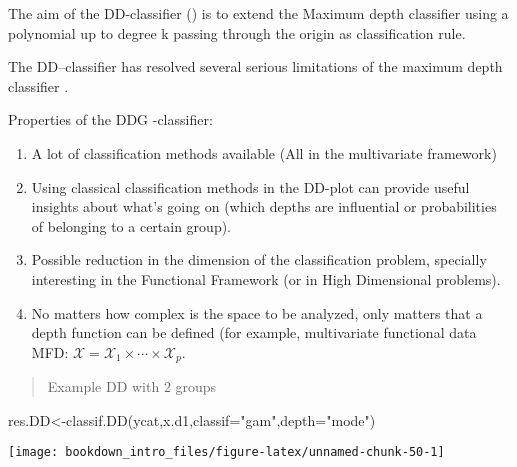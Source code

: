 \documentclass[
]{book}
\newenvironment{Shaded}{\begin{snugshade}}{\end{snugshade}}
\newcommand{\AttributeTok}[1]{\textcolor[rgb]{0.77,0.63,0.00}{#1}}
\newcommand{\FunctionTok}[1]{\textcolor[rgb]{0.00,0.00,0.00}{#1}}
\newcommand{\NormalTok}[1]{#1}
\newcommand{\OtherTok}[1]{\textcolor[rgb]{0.56,0.35,0.01}{#1}}
\newcommand{\SpecialCharTok}[1]{\textcolor[rgb]{0.00,0.00,0.00}{#1}}
\newcommand{\StringTok}[1]{\textcolor[rgb]{0.31,0.60,0.02}{#1}}
\begin{document}
The aim of the DD-classifier (\citep{Li2012}) is to extend the Maximum depth classifier using a polynomial up to degree k passing through the origin as classification rule.

The DD--classifier has resolved several serious limitations of the maximum depth classifier .

Properties of the DDG -classifier:

\begin{enumerate}
\def\labelenumi{\arabic{enumi}.}
\item
  A lot of classification methods available (All in the multivariate framework)
\item
  Using classical classification methods in the DD-plot can provide useful insights about what's going on (which depths are influential or probabilities of belonging to a certain group).
\item
  Possible reduction in the dimension of the classification problem, specially interesting in the Functional Framework (or in High Dimensional problems).
\item
  No matters how complex is the space to be analyzed, only matters that a depth function can be defined (for example, multivariate functional data MFD: \(\mathcal{X}=\mathcal{X}_1\times\cdots\times\mathcal{X}_p\).
\end{enumerate}

\begin{quote}
Example DD with 2 groups
\end{quote}

\begin{Shaded}
\begin{Highlighting}[]
\NormalTok{res.DD}\OtherTok{\textless{}{-}}\FunctionTok{classif.DD}\NormalTok{(ycat,x.d1,}\AttributeTok{classif=}\StringTok{"gam"}\NormalTok{,}\AttributeTok{depth=}\StringTok{"mode"}\NormalTok{)}
\end{Highlighting}
\end{Shaded}

\begin{center}\texttt{[image: bookdown\_intro\_files/figure-latex/unnamed-chunk-50-1]} \end{center}

\begin{Shaded}
\end{Shaded}
\end{document}
